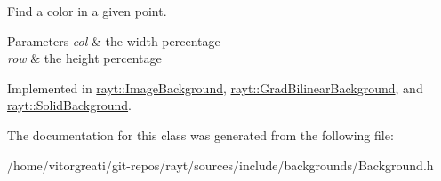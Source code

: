 Find a color in a given point. 


\begin{DoxyParams}{Parameters}
{\em col} & the width percentage \\
\hline
{\em row} & the height percentage \\
\hline
\end{DoxyParams}


Implemented in \mbox{\hyperlink{classrayt_1_1_image_background_a2b228ea0aa85f159b9d5b30f68ad809a}{rayt\+::\+Image\+Background}}, \mbox{\hyperlink{classrayt_1_1_grad_bilinear_background_a5619e0167b3ca7a7fb1ab7b9dec1b910}{rayt\+::\+Grad\+Bilinear\+Background}}, and \mbox{\hyperlink{classrayt_1_1_solid_background_a7eb2662ca6636b66da5f11d16f923248}{rayt\+::\+Solid\+Background}}.



The documentation for this class was generated from the following file\+:\begin{DoxyCompactItemize}
\item 
/home/vitorgreati/git-\/repos/rayt/sources/include/backgrounds/Background.\+h\end{DoxyCompactItemize}

